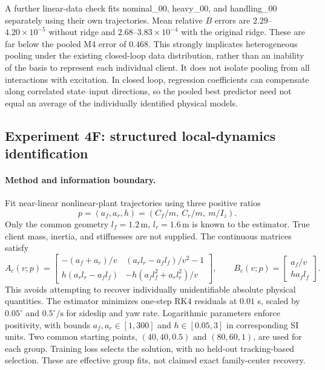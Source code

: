 A further linear-data check fits nominal\_00, heavy\_00, and handling\_00
separately using their own trajectories. Mean relative $B$ errors are
$2.29$--$4.20\times10^{-5}$ without ridge and
$2.68$--$3.83\times10^{-4}$ with the original ridge. These are far below
the pooled M4 error of $0.468$. This strongly implicates heterogeneous pooling
under the existing closed-loop data distribution, rather than an inability of
the basis to represent each individual client. It does not isolate pooling from
all interactions with excitation. In closed loop, regression coefficients can
compensate along correlated state--input directions, so the pooled best predictor
need not equal an average of the individually identified physical models.

\subsection{Experiment 4F: structured local-dynamics identification}
\label{sec:experiment4f}
\paragraph{Method and information boundary.}
Fit near-linear nonlinear-plant trajectories using three positive ratios
\begin{equation}
 p=(a_f,a_r,h)=\left(C_f/m,\ C_r/m,\ m/I_z\right).
\end{equation}
Only the common geometry $l_f=1.2\,\mathrm m$, $l_r=1.6\,\mathrm m$ is known
to the estimator. True client mass, inertia, and stiffnesses are not supplied.
The continuous matrices satisfy
\begin{equation}
 A_c(v;p)=\begin{bmatrix}
 -(a_f+a_r)/v & (a_rl_r-a_fl_f)/v^2-1\\
 h(a_rl_r-a_fl_f) & -h(a_fl_f^2+a_rl_r^2)/v
 \end{bmatrix},\qquad
 B_c(v;p)=\begin{bmatrix}a_f/v\\ha_fl_f\end{bmatrix}.
\end{equation}
This avoids attempting to recover individually unidentifiable absolute physical
quantities. The estimator minimizes one-step RK4 residuals at $0.01$ s, scaled
by $0.05^\circ$ and $0.5^\circ\mathrm{/s}$ for sideslip and yaw rate.
Logarithmic parameters enforce positivity, with bounds $a_f,a_r\in[1,300]$
and $h\in[0.05,3]$ in corresponding SI units. Two common starting points,
$(40,40,0.5)$ and $(80,60,1)$, are used for each group. Training loss selects
the solution, with no held-out tracking-based selection. These are effective
group fits, not claimed exact family-center recovery.

